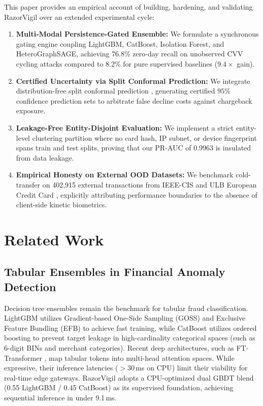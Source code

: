 \documentclass[conference]{IEEEtran}
\begin{document}
This paper provides an empirical account of building, hardening, and validating RazorVigil over an extended experimental cycle:
\begin{enumerate}
    \item \textbf{Multi-Modal Persistence-Gated Ensemble:} We formulate a synchronous gating engine coupling LightGBM, CatBoost, Isolation Forest, and HeteroGraphSAGE, achieving 76.8\% zero-day recall on unobserved CVV cycling attacks compared to 8.2\% for pure supervised baselines ($9.4\times$ gain).
    \item \textbf{Certified Uncertainty via Split Conformal Prediction:} We integrate distribution-free split conformal prediction \cite{angelopoulos2022gentle}, generating certified $95\%$ confidence prediction sets to arbitrate false decline costs against chargeback exposure.
    \item \textbf{Leakage-Free Entity-Disjoint Evaluation:} We implement a strict entity-level clustering partition where no card hash, IP subnet, or device fingerprint spans train and test splits, proving that our PR-AUC of 0.9963 is insulated from data leakage.
    \item \textbf{Empirical Honesty on External OOD Datasets:} We benchmark cold-transfer on 402,915 external transactions from IEEE-CIS \cite{vesta2019ieeecis} and ULB European Credit Card \cite{dalpozzolo2015calibrating}, explicitly attributing performance boundaries to the absence of client-side kinetic biometrics.
\end{enumerate}

\section{Related Work}
\label{sec:related}

\subsection{Tabular Ensembles in Financial Anomaly Detection}
Decision tree ensembles remain the benchmark for tabular fraud classification. LightGBM \cite{ke2017lightgbm} utilizes Gradient-based One-Side Sampling (GOSS) and Exclusive Feature Bundling (EFB) to achieve fast training, while CatBoost \cite{prokhorenkova2018catboost} utilizes ordered boosting to prevent target leakage in high-cardinality categorical spaces (such as 6-digit BINs and merchant categories). Recent deep architectures, such as FT-Transformer \cite{gorishniy2021revisiting}, map tabular tokens into multi-head attention spaces. While expressive, their inference latencies ($>30\,$ms on CPU) limit their viability for real-time edge gateways. RazorVigil adopts a CPU-optimized dual GBDT blend (0.55 LightGBM / 0.45 CatBoost) as its supervised foundation, achieving sequential inference in under 9.1\,ms.
\end{document}
